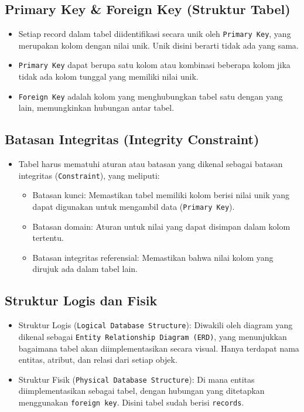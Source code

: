 \documentclass{article}
\begin{document}
\subsection{Primary Key \& Foreign Key (Struktur Tabel)}
\begin{itemize}
    \item Setiap record dalam tabel diidentifikasi secara unik oleh \texttt{Primary Key}, yang merupakan kolom dengan nilai unik. Unik disini berarti tidak ada yang sama.
    \item \texttt{Primary Key} dapat berupa satu kolom atau kombinasi beberapa kolom jika tidak ada kolom tunggal yang memiliki nilai unik.
    \item \texttt{Foreign Key} adalah kolom yang menghubungkan tabel satu dengan yang lain, memungkinkan hubungan antar tabel.
\end{itemize}

\subsection{Batasan Integritas (Integrity Constraint)}
\begin{itemize}
    \item Tabel harus mematuhi aturan atau batasan yang dikenal sebagai batasan integritas (\texttt{Constraint}), yang meliputi:
          \begin{itemize}
              \item Batasan kunci: Memastikan tabel memiliki kolom berisi nilai unik yang dapat digunakan untuk mengambil data (\texttt{Primary Key}).
              \item Batasan domain: Aturan untuk nilai yang dapat disimpan dalam kolom tertentu.
              \item Batasan integritas referensial: Memastikan bahwa nilai kolom yang dirujuk ada dalam tabel lain.
          \end{itemize}
\end{itemize}

\subsection{Struktur Logis dan Fisik}
\begin{itemize}
    \item Struktur Logis (\texttt{Logical Database Structure}): Diwakili oleh diagram yang dikenal sebagai \texttt{Entity Relationship Diagram (ERD)}, yang menunjukkan bagaimana tabel akan diimplementasikan secara visual. Hanya terdapat nama entitas, atribut, dan relasi dari setiap objek.
    \item Struktur Fisik (\texttt{Physical Database Structure}): Di mana entitas diimplementasikan sebagai tabel, dengan hubungan yang ditetapkan menggunakan \texttt{foreign key}. Disini tabel sudah berisi \texttt{records}.
\end{itemize}
\end{document}
